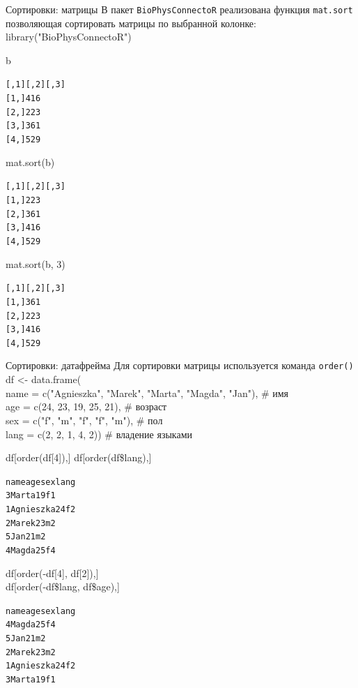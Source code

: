 \begin{frame}[fragile]{Сортировки: матрицы}
В пакет \footnotesize\verb"BioPhysConnectoR"\normalsize{} реализована функция \footnotesize\verb"mat.sort"\normalsize{} позволяющая сортировать матрицы по выбранной колонке:\\
library("BioPhysConnectoR")
\begin{multicols}{3}
b\\
\footnotesize
\begin{alltt}
     [,1] [,2] [,3]
[1,]    4    1    6
[2,]    2    2    3
[3,]    3    6    1
[4,]    5    2    9
\end{alltt}
\normalsize
mat.sort(b)\\
\footnotesize
\begin{alltt}
     [,1] [,2] [,3]
[1,]    2    2    3
[2,]    3    6    1
[3,]    4    1    6
[4,]    5    2    9
\end{alltt}
\normalsize
mat.sort(b, 3)\\
\footnotesize
\begin{alltt}
     [,1] [,2] [,3]
[1,]    3    6    1
[2,]    2    2    3
[3,]    4    1    6
[4,]    5    2    9
\end{alltt}
\normalsize
\end{multicols}
\end{frame}
\begin{frame}[fragile]{Сортировки: датафрейма}
Для сортировки матрицы используется команда \footnotesize\verb"order()"\normalsize\\
df <- data.frame(\\
name = c("Agnieszka"{}, "Marek"{}, "Marta"{}, "Magda"{}, "Jan"), \hfill \# имя\\
age = c(24, 23, 19, 25, 21), \hfill \# возраст\\
sex = c("f"{}, "m"{}, "f"{}, "f"{}, "m"), \hfill \# пол\\
lang = c(2, 2, 1, 4, 2)) \hfill \# владение языками
\begin{multicols}{2}
df[order(df[4]),]
df[order(df\$lang),]
\footnotesize
\begin{alltt}
           name age sex  lang
3        Marta    19     f        1
1 Agnieszka    24     f        2
2       Marek    23     m      2
5            Jan    21     m      2
4       Magda   25     f        4
\end{alltt}
\normalsize
df[order(-df[4], df[2]),]\\
df[order(-df\$lang, df\$age),]
\footnotesize
\begin{alltt}
           name age sex  lang
4       Magda   25     f        4
5            Jan    21     m      2
2       Marek    23     m      2
1 Agnieszka    24     f        2
3        Marta    19     f        1
\end{alltt}
\normalsize
\end{multicols}
\end{frame}

